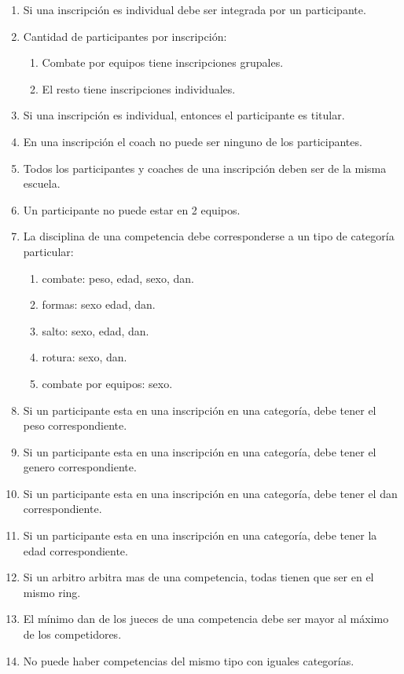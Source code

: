 \begin{enumerate}
  \item Si una inscripción es individual debe ser integrada por un participante.
  \item Cantidad de participantes por inscripción: \begin{enumerate}
    \item Combate por equipos tiene inscripciones grupales.
    \item El resto tiene inscripciones individuales. \end{enumerate}
  \item  Si una inscripción es individual, entonces el participante es titular.
  \item En una inscripción el coach no puede ser ninguno de los participantes.
  \item Todos los participantes y coaches de una inscripción deben ser de la misma escuela.
  \item Un participante no puede estar en 2 equipos.
  \item La disciplina de una competencia debe corresponderse a un tipo de categoría particular: \begin{enumerate}
    \item combate: peso, edad, sexo, dan.
    \item formas: sexo edad, dan.
    \item salto: sexo, edad, dan.
    \item rotura: sexo, dan.
    \item combate por equipos: sexo. \end{enumerate}
  \item Si un participante esta en una inscripción en una categoría, debe tener el peso correspondiente.
  \item Si un participante esta en una inscripción en una categoría, debe tener el genero correspondiente.
  \item Si un participante esta en una inscripción en una categoría, debe tener el dan correspondiente.
  \item Si un participante esta en una inscripción en una categoría, debe tener la edad correspondiente.
  \item Si un arbitro arbitra mas de una competencia, todas tienen que ser en el mismo ring.
  \item El mínimo dan de los jueces de una competencia debe ser mayor al máximo de los competidores.
  \item No puede haber competencias del mismo tipo con iguales categorías.
\end{enumerate}


